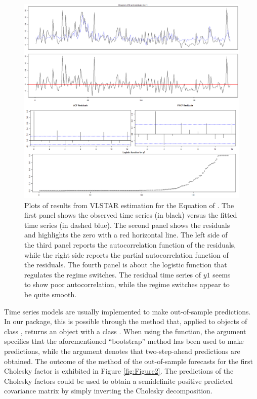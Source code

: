		
		
\begin{figure}[ht!]
			\centering
			\includegraphics[width = \columnwidth]{Equationy1}
			\caption{\label{fig:Figure1} Plots of results from VLSTAR estimation for the Equation of . The first panel shows the observed time series (in black) versus the fitted time series (in dashed blue). The second panel shows the residuals and highlights the zero with a red horizontal line. The left side of the third panel reports the autocorrelation function of the residuals, while the right side reports the partial autocorrelation function of the residuals. The fourth panel is about the logistic function that regulates the regime switches. The residual time series of $y1$ seems to show poor autocorrelation, while the regime switches appear to be quite smooth.}
\end{figure}
\clearpage
		
		
Time series models are usually implemented to make out-of-sample predictions. In our package, this is possible through the  method that, applied to objects of class , returns an object with a class . When using the  function, the argument  specifies that the aforementioned ``bootstrap'' method has been used to make predictions, while the argument  denotes that two-step-ahead predictions are obtained. The outcome of the  method of the out-of-sample forecasts for the first Cholesky factor is exhibited in Figure \ref{fig:Figure2}. The predictions of the Cholesky factors could be used to obtain a semidefinite positive predicted covariance matrix by simply inverting the Cholesky decomposition.

